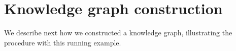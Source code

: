 \section{Knowledge graph construction}
We describe next how we constructed a knowledge graph, illustrating the procedure with this running example.
